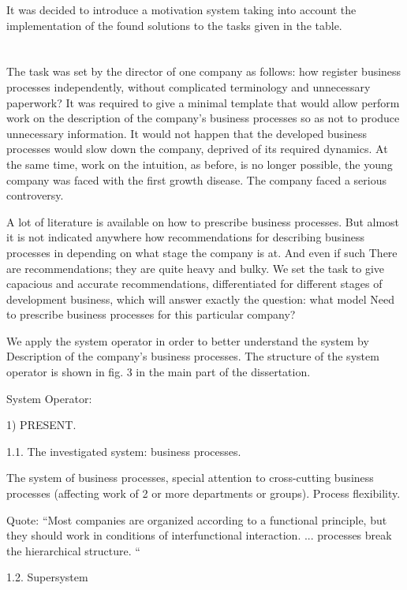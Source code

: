 \documentclass[11pt,a4paper]{book}
\begin{document}
It was decided to introduce a motivation system taking into account the
implementation of the found solutions to the tasks given in the table.

\chapter{}%

The task was set by the director of one company as follows: how register
business processes independently, without complicated terminology and
unnecessary paperwork? It was required to give a minimal template that would
allow perform work on the description of the company's business processes so
as not to produce unnecessary information. It would not happen that the
developed business processes would slow down the company, deprived of its
required dynamics. At the same time, work on the intuition, as before, is no
longer possible, the young company was faced with the first growth
disease. The company faced a serious controversy.

A lot of literature is available on how to prescribe business processes. But
almost it is not indicated anywhere how recommendations for describing
business processes in depending on what stage the company is at. And even if
such There are recommendations; they are quite heavy and bulky. We set the
task to give capacious and accurate recommendations, differentiated for
different stages of development business, which will answer exactly the
question: what model Need to prescribe business processes for this particular
company?

We apply the system operator in order to better understand the system by
Description of the company's business processes. The structure of the system
operator is shown in fig. 3 in the main part of the dissertation.

System Operator:

1) PRESENT.

1.1. The investigated system: business processes.

The system of business processes, special attention to cross-cutting business
processes (affecting work of 2 or more departments or groups). Process
flexibility.

Quote: “Most companies are organized according to a functional principle, but
they should work in conditions of interfunctional interaction. ... processes
break the hierarchical structure. “

1.2. Supersystem
\end{document}

